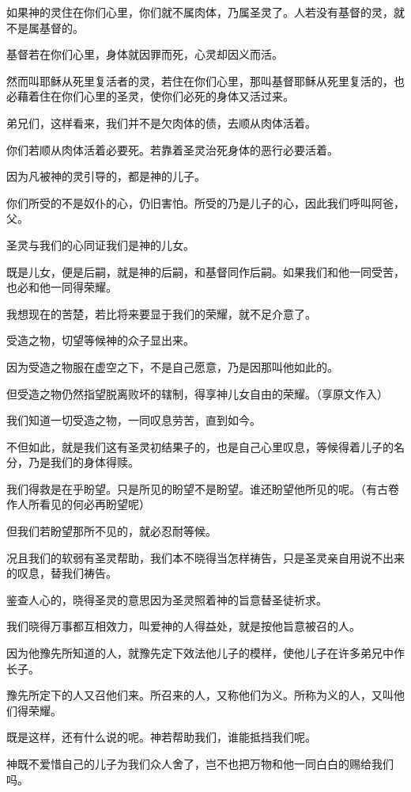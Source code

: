 \documentclass[12pt,oneside]{book}
\begin{document}
如果神的灵住在你们心里，你们就不属肉体，乃属圣灵了。人若没有基督的灵，就不是属基督的。

基督若在你们心里，身体就因罪而死，心灵却因义而活。

然而叫耶稣从死里复活者的灵，若住在你们心里，那叫基督耶稣从死里复活的，也必藉着住在你们心里的圣灵，使你们必死的身体又活过来。

弟兄们，这样看来，我们并不是欠肉体的债，去顺从肉体活着。

你们若顺从肉体活着必要死。若靠着圣灵治死身体的恶行必要活着。

因为凡被神的灵引导的，都是神的儿子。

你们所受的不是奴仆的心，仍旧害怕。所受的乃是儿子的心，因此我们呼叫阿爸，父。

圣灵与我们的心同证我们是神的儿女。

既是儿女，便是后嗣，就是神的后嗣，和基督同作后嗣。如果我们和他一同受苦，也必和他一同得荣耀。

我想现在的苦楚，若比将来要显于我们的荣耀，就不足介意了。

受造之物，切望等候神的众子显出来。

因为受造之物服在虚空之下，不是自己愿意，乃是因那叫他如此的。

但受造之物仍然指望脱离败坏的辖制，得享神儿女自由的荣耀。（享原文作入）

我们知道一切受造之物，一同叹息劳苦，直到如今。

不但如此，就是我们这有圣灵初结果子的，也是自己心里叹息，等候得着儿子的名分，乃是我们的身体得赎。

我们得救是在乎盼望。只是所见的盼望不是盼望。谁还盼望他所见的呢。（有古卷作人所看见的何必再盼望呢）

但我们若盼望那所不见的，就必忍耐等候。

况且我们的软弱有圣灵帮助，我们本不晓得当怎样祷告，只是圣灵亲自用说不出来的叹息，替我们祷告。

鉴查人心的，晓得圣灵的意思因为圣灵照着神的旨意替圣徒祈求。

我们晓得万事都互相效力，叫爱神的人得益处，就是按他旨意被召的人。

因为他豫先所知道的人，就豫先定下效法他儿子的模样，使他儿子在许多弟兄中作长子。

豫先所定下的人又召他们来。所召来的人，又称他们为义。所称为义的人，又叫他们得荣耀。

既是这样，还有什么说的呢。神若帮助我们，谁能抵挡我们呢。

神既不爱惜自己的儿子为我们众人舍了，岂不也把万物和他一同白白的赐给我们吗。
\end{document}

